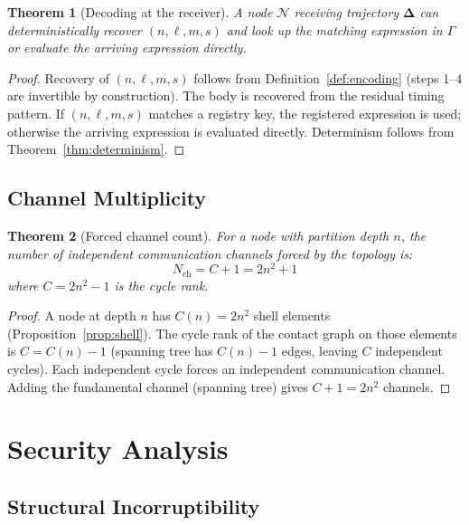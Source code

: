 \documentclass[twocolumn,11pt,a4paper]{article}
\newtheorem{theorem}{Theorem}[section]
\theoremstyle{definition}
\theoremstyle{remark}
\newcommand{\Node}{\mathcal{N}}
\newcommand{\Reg}{\Gamma}
\begin{document}
\begin{theorem}[Decoding at the receiver]
\label{thm:decoding}
A node $\Node$ receiving trajectory $\boldsymbol{\Delta}$ can
deterministically recover $(n, \ell, m, s)$ and look up the matching
expression in $\Reg$ or evaluate the arriving expression directly.
\end{theorem}
\begin{proof}
Recovery of $(n, \ell, m, s)$ follows from Definition~\ref{def:encoding}
(steps 1--4 are invertible by construction).  The body is recovered
from the residual timing pattern.  If $(n, \ell, m, s)$ matches a
registry key, the registered expression is used; otherwise the arriving
expression is evaluated directly.  Determinism follows from
Theorem~\ref{thm:determinism}.
\end{proof}

\subsection{Channel Multiplicity}

\begin{theorem}[Forced channel count]
\label{thm:channels}
For a node with partition depth $n$, the number of independent
communication channels forced by the topology is:
\[
N_{\mathrm{ch}} = C + 1 = 2n^2 + 1
\]
where $C = 2n^2 - 1$ is the cycle rank.
\end{theorem}
\begin{proof}
A node at depth $n$ has $C(n) = 2n^2$ shell elements
(Proposition~\ref{prop:shell}).  The cycle rank of the contact graph
on those elements is $C = C(n) - 1$ (spanning tree has $C(n)-1$ edges,
leaving $C$ independent cycles).  Each independent cycle forces an
independent communication channel.  Adding the fundamental channel
(spanning tree) gives $C + 1 = 2n^2$ channels.
\end{proof}

\section{Security Analysis}
\label{sec:security}

\subsection{Structural Incorruptibility}
\end{document}
